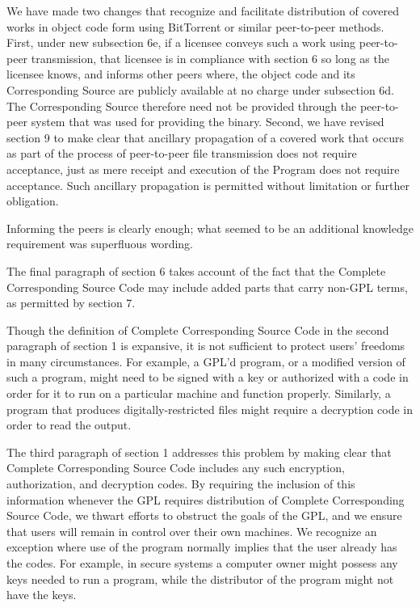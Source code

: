 
We have made two changes that recognize and facilitate distribution of
covered works in object code form using BitTorrent or similar peer-to-peer
methods.  First, under new subsection 6e, if a licensee conveys such a work
using peer-to-peer transmission, that licensee is in compliance with section
6 so long as the licensee knows, and informs other peers where, the object
code and its Corresponding Source are publicly available at no charge under
subsection 6d.  The Corresponding Source therefore need not be provided
through the peer-to-peer system that was used for providing the binary.
Second, we have revised section 9 to make clear that ancillary propagation of
a covered work that occurs as part of the process of peer-to-peer file
transmission does not require acceptance, just as mere receipt and execution
of the Program does not require acceptance.  Such ancillary propagation is
permitted without limitation or further obligation.


Informing the peers is clearly enough; what seemed to be an additional
knowledge requirement was superfluous wording.



The final paragraph of section 6 takes account of the fact that the Complete
Corresponding Source Code may include added parts that carry non-GPL terms,
as permitted by section 7.


Though the definition of Complete Corresponding Source Code in the second
paragraph of section 1 is expansive, it is not sufficient to protect users'
freedoms in many circumstances. For example, a GPL'd program, or a modified
version of such a program, might need to be signed with a key or authorized
with a code in order for it to run on a particular machine and function
properly. Similarly, a program that produces digitally-restricted files might
require a decryption code in order to read the output.

The third paragraph of section 1 addresses this problem by making clear that
Complete Corresponding Source Code includes any such encryption,
authorization, and decryption codes. By requiring the inclusion of this
information whenever the GPL requires distribution of Complete Corresponding
Source Code, we thwart efforts to obstruct the goals of the GPL, and we
ensure that users will remain in control over their own machines. We
recognize an exception where use of the program normally implies that the
user already has the codes. For example, in secure systems a computer owner
might possess any keys needed to run a program, while the distributor of the
program might not have the keys.


